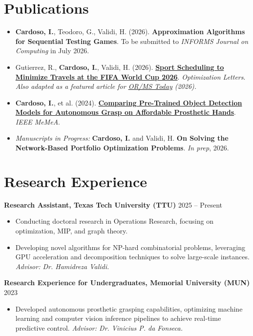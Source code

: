 \documentclass[letterpaper,10pt]{article}
\newcommand{\dategray}[1]{\textcolor{textgray}{#1}}
\begin{document}
\section{Publications}
\begin{itemize}[leftmargin=14pt, nosep, topsep=2pt, itemsep=4pt]
    \item \textbf{Cardoso, I.}, Teodoro, G., Validi, H. (2026). \textbf{Approximation Algorithms for Sequential Testing Games}. To be submitted to \textit{INFORMS Journal on Computing} in July 2026.
    \item Gutierrez, R., \textbf{Cardoso, I.}, Validi, H. (2026). \href{https://doi.org/10.1007/s11590-026-02320-x}{\textbf{Sport Scheduling to Minimize Travels at the FIFA World Cup 2026}}. \textit{Optimization Letters}. \small{\textit{Also adapted as a featured article for \href{https://pubsonline.informs.org/do/10.1287/orms.2026.02.11/full/}{OR/MS Today} (2026).}}
    \item \textbf{Cardoso, I.}, et al. (2024). \href{https://ieeexplore.ieee.org/document/10596873}{\textbf{Comparing Pre-Trained Object Detection Models for Autonomous Grasp on Affordable Prosthetic Hands}}. \textit{IEEE MeMeA}.
    \item \textit{Manuscripts in Progress:} \textbf{Cardoso, I.} and Validi, H. \textbf{On Solving the Network-Based Portfolio Optimization Problems}. \textit{In prep}, 2026.
\end{itemize}

\section{Research Experience}
\textbf{Research Assistant, Texas Tech University (TTU)} \hfill \dategray{2025 – Present}
\begin{itemize}[leftmargin=14pt, nosep, topsep=2pt, after=\vspace{4pt}]
    \item Conducting doctoral research in Operations Research, focusing on optimization, MIP, and graph theory.
    \item Developing novel algorithms for NP-hard combinatorial problems, leveraging GPU acceleration and decomposition techniques to solve large-scale instances. \textit{Advisor: Dr. Hamidreza Validi.}
\end{itemize}

\textbf{Research Experience for Undergraduates, Memorial University (MUN)} \hfill \dategray{2023}
\begin{itemize}[leftmargin=14pt, nosep, topsep=2pt]
    \item Developed autonomous prosthetic grasping capabilities, optimizing machine learning and computer vision inference pipelines to achieve real-time predictive control. \textit{Advisor: Dr. Vinicius P. da Fonseca.}
\end{itemize}
\end{document}
